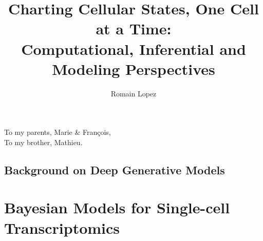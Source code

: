 \documentclass{ucbthesis}
\begin{document}

\title{\textbf{Charting Cellular States, One Cell at a Time:\\ Computational, Inferential and Modeling Perspectives}}
\author{Romain Lopez}


\maketitle
\copyrightpage



\begin{frontmatter}

\begin{dedication}
\null\vfil
\begin{center}
\begin{itshape}
To my parents, Marie \& Fran\c{c}ois, \\
To my brother, Mathieu.
\end{itshape}
\end{center}
\vfil\null
\end{dedication}

\setcounter{tocdepth}{2}
\setcounter{secnumdepth}{2}
\tableofcontents
\clearpage
\listoffigures
\clearpage
\listoftables


\end{frontmatter}

\pagestyle{headings}



\chapter{Background on Deep Generative Models}
\label{background}



\part{Bayesian Models for Single-cell Transcriptomics}
\label{part1}
\end{document}
